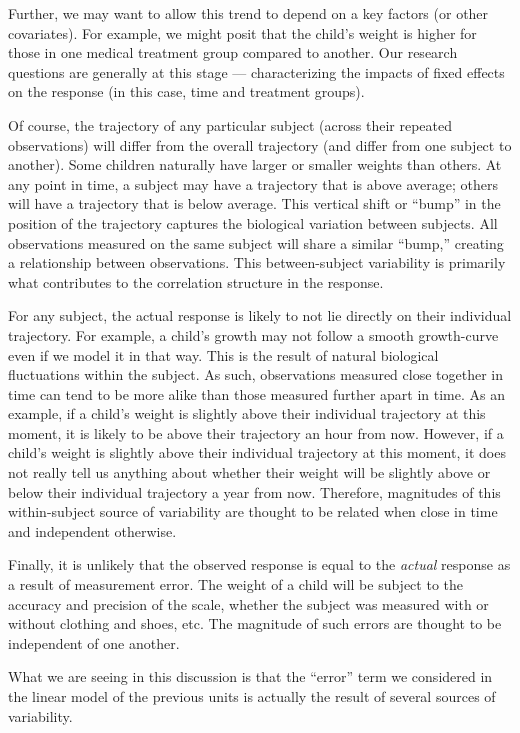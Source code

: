 \documentclass[
  letterpaper,
  DIV=11,
  numbers=noendperiod]{scrreprt}
\theoremstyle{definition}
\theoremstyle{definition}
\theoremstyle{remark}
\begin{document}
Further, we may want to allow this trend to depend on a key factors (or
other covariates). For example, we might posit that the child's weight
is higher for those in one medical treatment group compared to another.
Our research questions are generally at this stage --- characterizing
the impacts of fixed effects on the response (in this case, time and
treatment groups).

Of course, the trajectory of any particular subject (across their
repeated observations) will differ from the overall trajectory (and
differ from one subject to another). Some children naturally have larger
or smaller weights than others. At any point in time, a subject may have
a trajectory that is above average; others will have a trajectory that
is below average. This vertical shift or ``bump'' in the position of the
trajectory captures the biological variation between subjects. All
observations measured on the same subject will share a similar ``bump,''
creating a relationship between observations. This between-subject
variability is primarily what contributes to the correlation structure
in the response.

For any subject, the actual response is likely to not lie directly on
their individual trajectory. For example, a child's growth may not
follow a smooth growth-curve even if we model it in that way. This is
the result of natural biological fluctuations within the subject. As
such, observations measured close together in time can tend to be more
alike than those measured further apart in time. As an example, if a
child's weight is slightly above their individual trajectory at this
moment, it is likely to be above their trajectory an hour from now.
However, if a child's weight is slightly above their individual
trajectory at this moment, it does not really tell us anything about
whether their weight will be slightly above or below their individual
trajectory a year from now. Therefore, magnitudes of this within-subject
source of variability are thought to be related when close in time and
independent otherwise.

Finally, it is unlikely that the observed response is equal to the
\emph{actual} response as a result of measurement error. The weight of a
child will be subject to the accuracy and precision of the scale,
whether the subject was measured with or without clothing and shoes,
etc. The magnitude of such errors are thought to be independent of one
another.

What we are seeing in this discussion is that the ``error'' term we
considered in the linear model of the previous units is actually the
result of several sources of variability.
\end{document}
